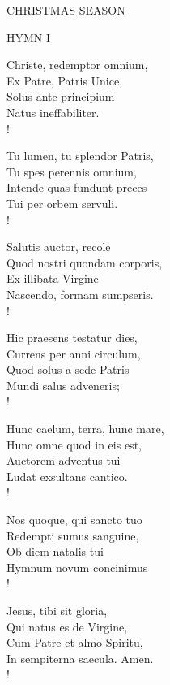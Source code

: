 \begin{center}\normalsize CHRISTMAS SEASON\\
\end{center}

\noindent\small{\uppercase{Hymn I }}\normalsize\label{christmas:firstHymn}
\begin{cverse}
Christe, redemptor omnium,\\
Ex Patre, Patris Unice,\\
Solus ante principium\\
Natus ineffabiliter.\\!

Tu lumen, tu splendor Patris,\\
Tu spes perennis omnium,\\
Intende quas fundunt preces\\
Tui per orbem servuli.\\!

Salutis auctor, recole\\
Quod nostri quondam corporis,\\
Ex illibata Virgine\\
Nascendo, formam sumpseris.\\!

Hic praesens testatur dies,\\
Currens per anni circulum,\\
Quod solus a sede Patris\\
Mundi salus adveneris;\\!

Hunc caelum, terra, hunc mare,\\
Hunc omne quod in eis est,\\
Auctorem adventus tui\\
Ludat exsultans cantico.\\!

Nos quoque, qui sancto tuo\\
Redempti sumus sanguine,\\
Ob diem natalis tui\\
Hymnum novum concinimus\\!

Jesus, tibi sit gloria,\\
Qui natus es de Virgine,\\
Cum Patre et almo Spiritu,\\
In sempiterna saecula. Amen.\\!
\end{cverse}

